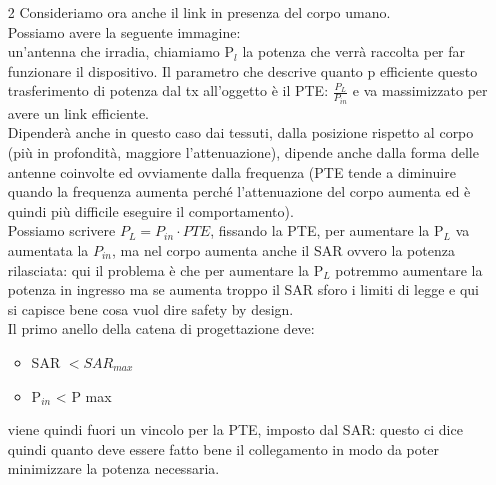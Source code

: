 \documentclass[oneside, 12pt]{extbook}
\begin{document}
\begin{itemize}
	\item[2] Consideriamo ora anche il link in presenza del corpo umano.\\Possiamo avere la seguente immagine:\\un'antenna che irradia, chiamiamo P$_l$ la potenza che verrà raccolta per far funzionare il dispositivo. Il parametro che descrive quanto p efficiente questo trasferimento di potenza dal tx all'oggetto è il PTE: $\frac{P_L}{P_{in}}$ e va massimizzato per avere un link efficiente.\\Dipenderà anche in questo caso dai tessuti, dalla posizione rispetto al corpo (più in profondità, maggiore l'attenuazione), dipende anche dalla forma delle antenne coinvolte ed ovviamente dalla frequenza (PTE tende a diminuire quando la frequenza aumenta perché l'attenuazione del corpo aumenta ed è quindi più difficile eseguire il comportamento).\\Possiamo scrivere $P_L = P_{in} \cdot PTE$, fissando la PTE, per aumentare la P$_L$ va aumentata la $P_{in}$, ma nel corpo aumenta anche il SAR ovvero la potenza rilasciata: qui il problema è che per aumentare la P$_L$ potremmo aumentare la potenza in ingresso ma se aumenta troppo il SAR sforo i limiti di legge e qui si capisce bene cosa vuol dire safety by design.\\Il primo anello della catena di progettazione deve:
	\begin{itemize}
		\item SAR $< SAR_{max}$
		\item P$_{in}$ < P max
	\end{itemize} 
	viene quindi fuori un vincolo per la PTE, imposto dal SAR: questo ci dice quindi quanto deve essere fatto bene il collegamento in modo da poter minimizzare la potenza necessaria.
\end{itemize}
\end{document}
